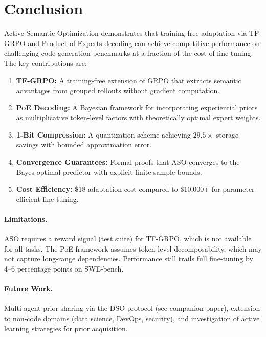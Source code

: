 \documentclass[11pt]{article}
\begin{document}
\section{Conclusion}
\label{sec:conclusion}

Active Semantic Optimization demonstrates that training-free adaptation via
TF-GRPO and Product-of-Experts decoding can achieve competitive performance on
challenging code generation benchmarks at a fraction of the cost of fine-tuning.
The key contributions are:

\begin{enumerate}[leftmargin=1.5em]
    \item \textbf{TF-GRPO:} A training-free extension of GRPO that extracts
          semantic advantages from grouped rollouts without gradient computation.
    \item \textbf{PoE Decoding:} A Bayesian framework for incorporating
          experiential priors as multiplicative token-level factors with
          theoretically optimal expert weights.
    \item \textbf{1-Bit Compression:} A quantization scheme achieving
          $29.5\times$ storage savings with bounded approximation error.
    \item \textbf{Convergence Guarantees:} Formal proofs that ASO converges to
          the Bayes-optimal predictor with explicit finite-sample bounds.
    \item \textbf{Cost Efficiency:} \$18 adaptation cost compared to
          \$10{,}000+ for parameter-efficient fine-tuning.
\end{enumerate}

\paragraph{Limitations.}
ASO requires a reward signal (test suite) for TF-GRPO, which is not available
for all tasks. The PoE framework assumes token-level decomposability, which may
not capture long-range dependencies. Performance still trails full fine-tuning
by 4--6 percentage points on SWE-bench.

\paragraph{Future Work.}
Multi-agent prior sharing via the DSO protocol (see companion paper),
extension to non-code domains (data science, DevOps, security), and
investigation of active learning strategies for prior acquisition.
\end{document}
